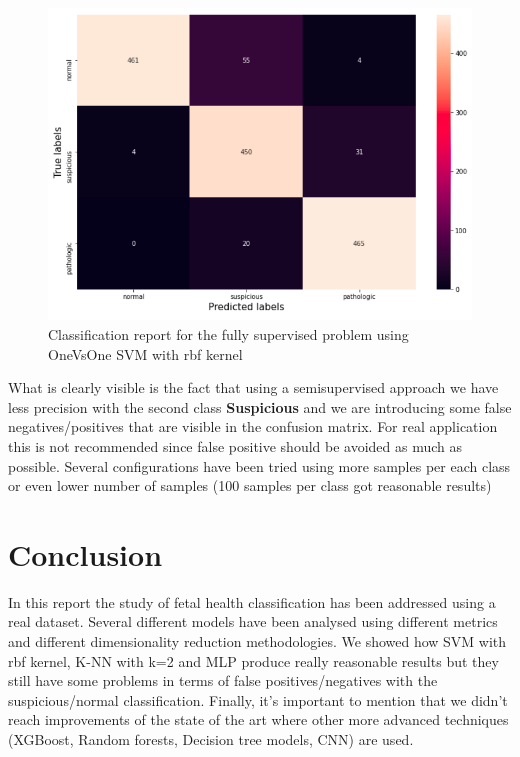 \documentclass[a4paper,12pt]{article}
\begin{document}
\begin{figure}[H]
  \begin{center}
  \includegraphics[width=1.0\textwidth]{images/fully.png}
  \end{center}
  \caption{Classification report for the fully supervised problem using OneVsOne SVM with rbf kernel}
  \label{fig:fully}
\end{figure}

\noindent What is clearly visible is the fact that using a semisupervised approach we have less precision with the second class \textbf{Suspicious} and we are introducing some false negatives/positives that are visible in the confusion matrix. For real application this is not recommended since false positive should be avoided as much as possible. Several configurations have been tried using more samples per each class or even lower number of samples (100 samples per class got reasonable results)

\newpage
\section{Conclusion}

In this report the study of fetal health classification has been addressed using a real dataset. Several different models have been analysed using different metrics and different dimensionality reduction methodologies. We showed how SVM with rbf kernel, K-NN with k=2 and MLP produce really reasonable results but they still have some problems in terms of false positives/negatives with the suspicious/normal classification. Finally, it's important to mention that we didn't reach improvements of the state of the art where other more advanced techniques (XGBoost, Random forests, Decision tree models, CNN) are used. \cite{ann} \cite{cnn}
\end{document}
